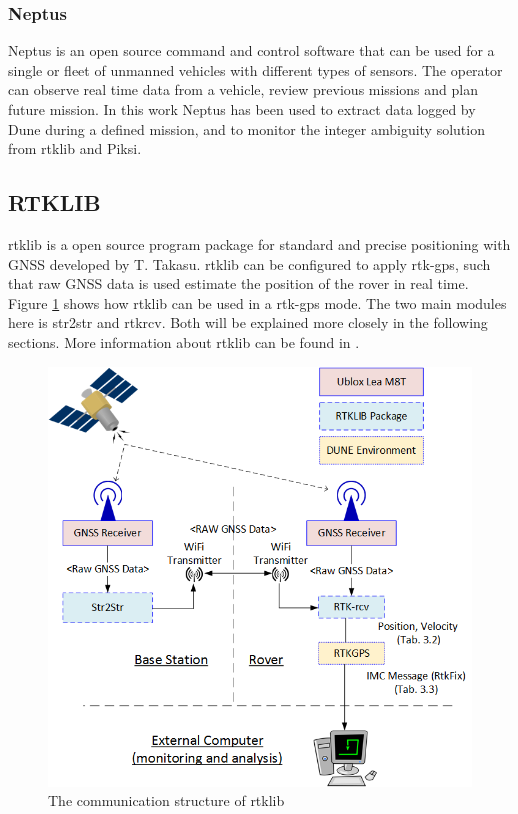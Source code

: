\subsubsection{Neptus}
Neptus is an open source command and control software that can be used for a single or fleet of unmanned vehicles with different types of sensors. The operator can observe real time data from a vehicle, review previous missions and plan future mission. In this work Neptus has been used to extract data logged by Dune during a defined mission, and to monitor the integer ambiguity solution from \gls{rtklib} and Piksi.
\subsection{RTKLIB}\label{ss:Rtklib}
\acrfull{rtklib} is a open source program package for standard and precise positioning with GNSS developed by T. Takasu. \gls{rtklib} can be configured to apply \gls{rtk-gps}, such that raw GNSS data is used estimate the position of the rover in real time. Figure \ref{figure:RTKLIB_STRUCTURE} shows how \gls{rtklib} can be used in a \gls{rtk-gps} mode. The two main modules here is str2str and rtkrcv. Both will be explained more closely in the following sections. More information about  \gls{rtklib} can be found in \citep{Rtklib242}.

\begin{figure}[H]
	\centering
		\includegraphics[width=1\textwidth]{figs/RTKLIB.png}
		\caption{The communication structure of \gls{rtklib}}
		\label{figure:RTKLIB_STRUCTURE}
\end{figure}
